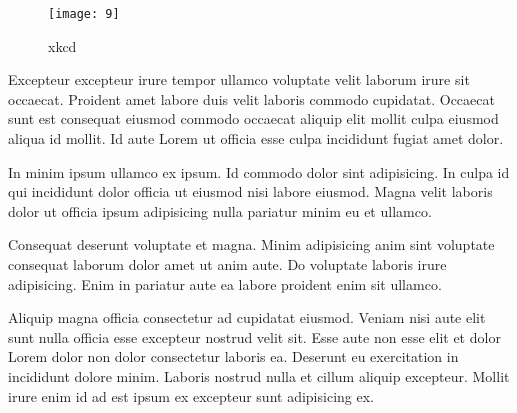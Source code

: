 \begin{figure}[!h]
    \centering
    \texttt{[image: 9]}
    \caption{xkcd}
    \label{fig:xkcd}
\end{figure}

Excepteur excepteur irure tempor ullamco voluptate velit laborum irure sit occaecat. Proident amet labore duis velit laboris commodo cupidatat. Occaecat sunt est consequat eiusmod commodo occaecat aliquip elit mollit culpa eiusmod aliqua id mollit. Id aute Lorem ut officia esse culpa incididunt fugiat amet dolor.

In minim ipsum ullamco ex ipsum. Id commodo dolor sint adipisicing. In culpa id qui incididunt dolor officia ut eiusmod nisi labore eiusmod. Magna velit laboris dolor ut officia ipsum adipisicing nulla pariatur minim eu et ullamco.

Consequat deserunt voluptate et magna. Minim adipisicing anim sint voluptate consequat laborum dolor amet ut anim aute. Do voluptate laboris irure adipisicing. Enim in pariatur aute ea labore proident enim sit ullamco.

Aliquip magna officia consectetur ad cupidatat eiusmod. Veniam nisi aute elit sunt nulla officia esse excepteur nostrud velit sit. Esse aute non esse elit et dolor Lorem dolor non dolor consectetur laboris ea. Deserunt eu exercitation in incididunt dolore minim. Laboris nostrud nulla et cillum aliquip excepteur. Mollit irure enim id ad est ipsum ex excepteur sunt adipisicing ex.